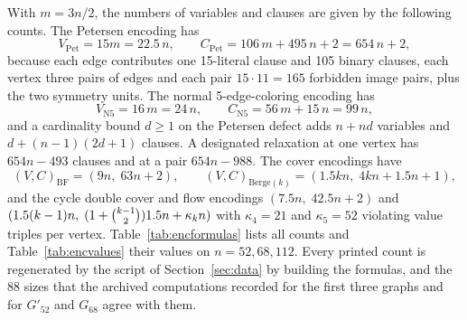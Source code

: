 \documentclass[11pt]{article}
\theoremstyle{definition}
\theoremstyle{remark}
\newcommand{\Gmain}{G_{112}}
\newcommand{\Gsym}{H_{112}}
\newcommand{\Gfty}{G_{52}}
\newcommand{\Gftyb}{G'_{52}}
\newcommand{\Gsix}{G_{68}}
\begin{document}
With $m = 3n/2$, the numbers of variables and clauses are given by the following counts. The
Petersen encoding has
\begin{equation}\label{eq:size-pet}
V_{\mathrm{Pet}} = 15m = 22.5\,n, \qquad C_{\mathrm{Pet}} = 106\,m + 495\,n + 2 = 654\,n + 2,
\end{equation}
because each edge contributes one 15-literal clause and 105 binary clauses, each vertex three pairs
of edges and each pair $15 \cdot 11 = 165$ forbidden image pairs, plus the two symmetry units. The
normal 5-edge-coloring encoding has
\begin{equation}\label{eq:size-n5}
V_{\mathrm{N5}} = 16\,m = 24\,n, \qquad C_{\mathrm{N5}} = 56\,m + 15\,n = 99\,n,
\end{equation}
and a cardinality bound $d \ge 1$ on the Petersen defect adds $n + nd$ variables and
$d + (n-1)(2d+1)$ clauses. A designated relaxation at one vertex has $654n - 493$ clauses and at a
pair $654n - 988$. The cover encodings have
\begin{equation}\label{eq:size-cover}
(V,C)_{\mathrm{BF}} = (9n,\; 63n + 2), \qquad (V,C)_{\mathrm{Berge}(k)} = (1.5kn,\; 4kn + 1.5n + 1),
\end{equation}
and the cycle double cover and flow encodings $(7.5n,\; 42.5n + 2)$ and
$(1.5(k-1)n,\; (1 + \tbinom{k-1}{2})1.5n + \kappa_k n)$ with $\kappa_4 = 21$ and $\kappa_5 = 52$
violating value triples per vertex. Table~\ref{tab:encformulas} lists all counts and
Table~\ref{tab:encvalues} their values on $n = 52, 68, 112$. Every printed count is regenerated by
the script of Section~\ref{sec:data} by building the formulas, and the 88 sizes that the archived
computations recorded for the first three graphs and for $\Gftyb$ and $\Gsix$ agree with them.

\begin{table}[htbp]\centering\footnotesize\setlength{\tabcolsep}{4pt}

\caption{Variables and clauses of every encoding as functions of the order $n$ (the counter
bound $b$ of the oddness and resistance rows is the bound tested).}\label{tab:encformulas}
\end{table}

\begin{table}[htbp]\centering\footnotesize\setlength{\tabcolsep}{4pt}

\caption{Variables and clauses of every encoding on the graphs of order 52 ($\Gfty$, $\Gftyb$),
68 ($\Gsix$) and 112 ($\Gmain$, $\Gsym$), computed by building each formula with the encoders of the
repository.}\label{tab:encvalues}
\end{table}
\end{document}
